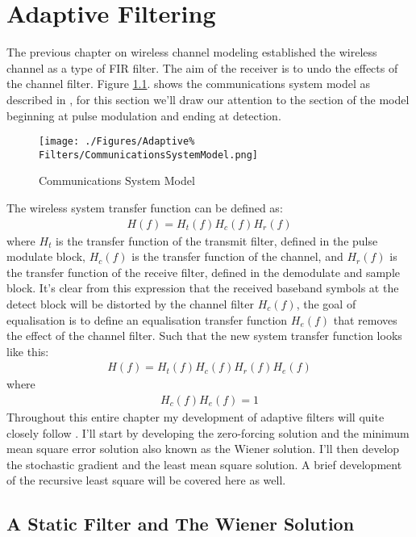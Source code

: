 \chapter{Adaptive Filtering}
\label{chap:AdaptiveFiltering}
The previous chapter on wireless channel modeling established %
the wireless channel as a type of FIR filter. The aim of the %
receiver is to undo the effects of the channel filter. %
Figure \ref{fig:CommSysModel}. shows the communications %
system model as described in \cite{Sklar01}, for this section %
we'll draw our attention to the section of the model beginning %
at pulse modulation and ending at detection. 
\begin{figure}[ht]
	\texttt{[image: ./Figures/Adaptive\%
		Filters/CommunicationsSystemModel.png]}
	\caption{Communications System Model \cite{Sklar01}}
	\label{fig:CommSysModel}
\end{figure}
The wireless system transfer function can be defined as:
\begin{align}
	H(f) = H_{t}(f)H_{c}(f)H_{r}(f)
\end{align}
where $H_{t}$ is the transfer function of the transmit filter, 
defined in the pulse modulate block, %
$H_{c}(f)$ is the transfer function of the channel, and $H_{r}%
(f)$ is the transfer function of the receive filter, defined in %
the demodulate and sample block. It's clear from this %
expression that the received baseband symbols at the %
detect block will be distorted by the channel filter $H_{c}%
(f)$, the goal of equalisation is to define an equalisation %
transfer function $H_{e}(f)$ that removes the effect of %
the channel filter. Such that the new system transfer %
function looks like this:
\begin{align}
	H(f) = H_{t}(f)H_{c}(f)H_{r}(f)H_{e}(f)
\end{align}
where
\begin{align}
	H_{c}(f)H_{e}(f) = 1
\end{align}
Throughout this entire chapter my development of adaptive filters %
will quite closely follow \cite{Hay02}. I'll start by %
developing the zero-forcing solution and the minimum mean square %
error solution also known as the Wiener solution. I'll then develop %
the stochastic gradient and the least mean square solution. A brief %
development of the recursive least square will be covered here as %
well.

\section{A Static Filter and The Wiener Solution}
